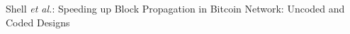 \documentclass[10pt,journal,compsoc]{IEEEtran}
\begin{document}
% 
%



%
{Shell \MakeLowercase{\textit{et al.}}: Speeding up Block Propagation in Bitcoin Network: Uncoded and Coded Designs}
% 



\end{document}
